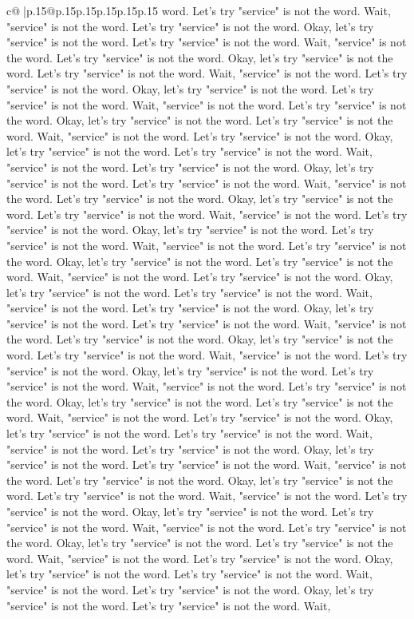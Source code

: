 \documentclass{article}
\begin{document}
{\begin{supertabular}{c@{$\;$}|p{.15\linewidth}@{}p{.15\linewidth}p{.15\linewidth}p{.15\linewidth}p{.15\linewidth}p{.15\linewidth}}
{{{word. Let's try "service" is not the word. Wait, "service" is not the word. Let's try "service" is not the word. Okay, let's try "service" is not the word. Let's try "service" is not the word. Wait, "service" is not the word. Let's try "service" is not the word. Okay, let's try "service" is not the word. Let's try "service" is not the word. Wait, "service" is not the word. Let's try "service" is not the word. Okay, let's try "service" is not the word. Let's try "service" is not the word. Wait, "service" is not the word. Let's try "service" is not the word. Okay, let's try "service" is not the word. Let's try "service" is not the word. Wait, "service" is not the word. Let's try "service" is not the word. Okay, let's try "service" is not the word. Let's try "service" is not the word. Wait, "service" is not the word. Let's try "service" is not the word. Okay, let's try "service" is not the word. Let's try "service" is not the word. Wait, "service" is not the word. Let's try "service" is not the word. Okay, let's try "service" is not the word. Let's try "service" is not the word. Wait, "service" is not the word. Let's try "service" is not the word. Okay, let's try "service" is not the word. Let's try "service" is not the word. Wait, "service" is not the word. Let's try "service" is not the word. Okay, let's try "service" is not the word. Let's try "service" is not the word. Wait, "service" is not the word. Let's try "service" is not the word. Okay, let's try "service" is not the word. Let's try "service" is not the word. Wait, "service" is not the word. Let's try "service" is not the word. Okay, let's try "service" is not the word. Let's try "service" is not the word. Wait, "service" is not the word. Let's try "service" is not the word. Okay, let's try "service" is not the word. Let's try "service" is not the word. Wait, "service" is not the word. Let's try "service" is not the word. Okay, let's try "service" is not the word. Let's try "service" is not the word. Wait, "service" is not the word. Let's try "service" is not the word. Okay, let's try "service" is not the word. Let's try "service" is not the word. Wait, "service" is not the word. Let's try "service" is not the word. Okay, let's try "service" is not the word. Let's try "service" is not the word. Wait, "service" is not the word. Let's try "service" is not the word. Okay, let's try "service" is not the word. Let's try "service" is not the word. Wait, "service" is not the word. Let's try "service" is not the word. Okay, let's try "service" is not the word. Let's try "service" is not the word. Wait, "service" is not the word. Let's try "service" is not the word. Okay, let's try "service" is not the word. Let's try "service" is not the word. Wait, "service" is not the word. Let's try "service" is not the word. Okay, let's try "service" is not the word. Let's try "service" is not the word. Wait, "service" is not the word. Let's try "service" is not the word. Okay, let's try "service" is not the word. Let's try "service" is not the word. Wait, "service" is not the word. Let's try "service" is not the word. Okay, let's try "service" is not the word. Let's try "service" is not the word. Wait, }}}
\end{supertabular}}
\end{document}

